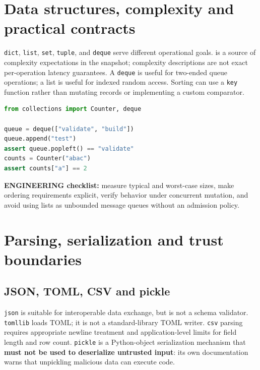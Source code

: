 \documentclass[
  11pt,
]{report}
\newcommand{\passthrough}[1]{#1}
\begin{document}
\chapter{Data structures, complexity and practical
contracts}\label{data-structures-complexity-and-practical-contracts}

\passthrough{\lstinline!dict!}, \passthrough{\lstinline!list!},
\passthrough{\lstinline!set!}, \passthrough{\lstinline!tuple!}, and
\passthrough{\lstinline!deque!} serve different operational goals.
 is a source
of complexity expectations in the snapshot; complexity descriptions are
not exact per-operation latency guarantees. A
\passthrough{\lstinline!deque!} is useful for two-ended queue
operations; a list is useful for indexed random access. Sorting can use
a \passthrough{\lstinline!key!} function rather than mutating records or
implementing a custom comparator.

\begin{lstlisting}[language=Python]
from collections import Counter, deque

queue = deque(["validate", "build"])
queue.append("test")
assert queue.popleft() == "validate"
counts = Counter("abac")
assert counts["a"] == 2
\end{lstlisting}

\textbf{ENGINEERING checklist:} measure typical and worst-case sizes,
make ordering requirements explicit, verify behavior under concurrent
mutation, and avoid using lists as unbounded message queues without an
admission policy.

\chapter{Parsing, serialization and trust
boundaries}\label{parsing-serialization-and-trust-boundaries}

\section{JSON, TOML, CSV and pickle}\label{json-toml-csv-and-pickle}

\passthrough{\lstinline!json!} is suitable for interoperable data
exchange, but is not a schema validator.
\passthrough{\lstinline!tomllib!} loads TOML; it is not a
standard-library TOML writer. \passthrough{\lstinline!csv!} parsing
requires appropriate newline treatment and application-level limits for
field length and row count. \passthrough{\lstinline!pickle!} is a
Python-object serialization mechanism that \textbf{must not be used to
deserialize untrusted input}: its own documentation warns that
unpickling malicious data can execute code.
\end{document}

